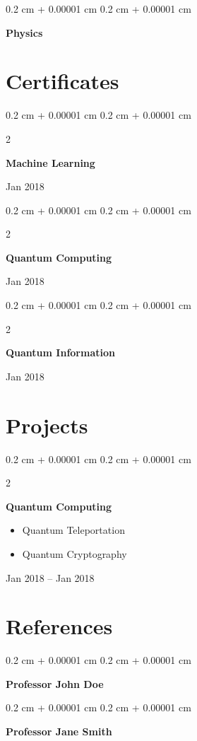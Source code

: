 \documentclass[10pt, letterpaper]{article}
\newenvironment{highlights}{
    \begin{itemize}[
        topsep=0.10 cm,
        parsep=0.10 cm,
        partopsep=0pt,
        itemsep=0pt,
        leftmargin=0.4 cm + 10pt
    ]
}{
    \end{itemize}
} %
\newenvironment{onecolentry}{
    \begin{adjustwidth}{
        0.2 cm + 0.00001 cm
    }{
        0.2 cm + 0.00001 cm
    }
}{
    \end{adjustwidth}
} %
\newenvironment{twocolentry}[2][]{
    \onecolentry
    \def\secondColumn{#2}
    \setcolumnwidth{\fill, 4.5 cm}
    \begin{paracol}{2}
}{
    \switchcolumn \raggedleft \secondColumn
    \end{paracol}
    \endonecolentry
} %
\begin{document}
        
        \begin{onecolentry}
            \textbf{Physics}
        \end{onecolentry}



    
    \section{Certificates}



        
        \begin{twocolentry}{
            Jan 2018
        }
            \textbf{Machine Learning}
        \end{twocolentry}


        \vspace{0.2 cm}

        \begin{twocolentry}{
            Jan 2018
        }
            \textbf{Quantum Computing}
        \end{twocolentry}


        \vspace{0.2 cm}

        \begin{twocolentry}{
            Jan 2018
        }
            \textbf{Quantum Information}
        \end{twocolentry}



    
    \section{Projects}



        
        \begin{twocolentry}{
            Jan 2018 – Jan 2018
        }
            \textbf{Quantum Computing}
            \begin{highlights}
                \item Quantum Teleportation
                \item Quantum Cryptography
            \end{highlights}
        \end{twocolentry}



    
    \section{References}



        
        \begin{onecolentry}
            \textbf{Professor John Doe}
        \end{onecolentry}


        \vspace{0.2 cm}

        \begin{onecolentry}
            \textbf{Professor Jane Smith}
        \end{onecolentry}



    
\end{document}
